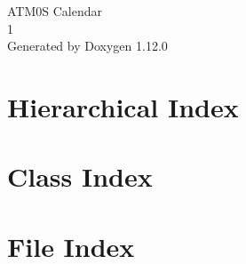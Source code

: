 \documentclass[twoside]{book}
\newcommand{\+}{\discretionary{\mbox{\scriptsize$\hookleftarrow$}}{}{}}
\newcommand{\clearemptydoublepage}{%
    \newpage{\pagestyle{empty}\cleardoublepage}%
  }
\begin{document}
  \raggedbottom
    \hypersetup{pageanchor=false,
                bookmarksnumbered=true,
                pdfencoding=unicode
               }
  \begin{titlepage}
  \vspace*{7cm}
  \begin{center}%
  {\Large ATM0\+S Calendar}\\
  [1ex]\large 1 \\
  \vspace*{1cm}
  {\large Generated by Doxygen 1.12.0}\\
  \end{center}
  \end{titlepage}
  \clearemptydoublepage
  \tableofcontents
  \clearemptydoublepage
  \hypersetup{pageanchor=true}
\chapter{Hierarchical Index}

\chapter{Class Index}

\chapter{File Index}

\end{document}
